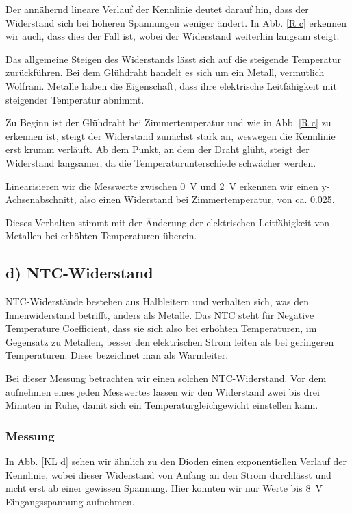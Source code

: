 \documentclass[11pt,a4paper,titlepage, ngerman]{article}
\begin{document}
				Der annähernd lineare Verlauf der Kennlinie deutet darauf hin, dass der Widerstand sich bei höheren Spannungen weniger ändert.
				In Abb. \ref{R c} erkennen wir auch, dass dies der Fall ist, wobei der Widerstand weiterhin langsam steigt.
				
				Das allgemeine Steigen des Widerstands lässt sich auf die steigende Temperatur zurückführen.
				Bei dem Glühdraht handelt es sich um ein Metall, vermutlich Wolfram.
				Metalle haben die Eigenschaft, dass ihre elektrische Leitfähigkeit mit steigender Temperatur abnimmt.
				
				Zu Beginn ist der Glühdraht bei Zimmertemperatur und wie in Abb. \ref{R c} zu erkennen ist, steigt der Widerstand zunächst stark an, weswegen die Kennlinie erst krumm verläuft.
				Ab dem Punkt, an dem der Draht glüht, steigt der Widerstand langsamer, da die Temperaturunterschiede schwächer werden.
				
				Linearisieren wir die Messwerte zwischen \SI{0}{\V} und \SI{2}{\V} erkennen wir einen y-Achsenabschnitt, also einen Widerstand bei Zimmertemperatur, von ca. \SI{0,025}{\Omega}.
				
				Dieses Verhalten stimmt mit der Änderung der elektrischen Leitfähigkeit von Metallen bei erhöhten Temperaturen überein.
				
		\subsection{d) NTC-Widerstand} 
			
			NTC-Widerstände bestehen aus Halbleitern und verhalten sich, was den Innenwiderstand betrifft, anders als Metalle.
			Das \glqq NTC\grqq{} steht für \glqq Negative Temperature Coefficient\grqq{}, dass sie sich also bei erhöhten Temperaturen, im Gegensatz zu Metallen, besser den elektrischen Strom leiten als bei geringeren Temperaturen. Diese bezeichnet man als Warmleiter.
			
			Bei dieser Messung betrachten wir einen solchen NTC-Widerstand.
			Vor dem aufnehmen eines jeden Messwertes lassen wir den Widerstand zwei bis drei Minuten in Ruhe, damit sich ein Temperaturgleichgewicht einstellen kann.
			
			\subsubsection*{Messung}
			
				In Abb. \ref{KL d} sehen wir ähnlich zu den Dioden einen exponentiellen Verlauf der Kennlinie, wobei dieser Widerstand von Anfang an den Strom durchlässt und nicht erst ab einer gewissen Spannung.
				Hier konnten wir nur Werte bis \SI{8}{\V} Eingangsspannung aufnehmen.
				
\end{document}
